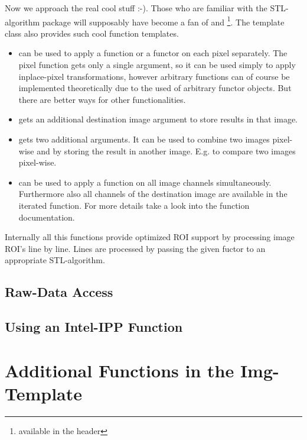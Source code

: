 Now we approach the real cool stuff :-). Those who are familiar with the STL-algorithm package will supposably have become a fan of  and \footnote{available in the  header}. The  template class also provides such cool function templates. 
\begin{itemize}
\item {} can be used to apply a function or a functor on each pixel separately. The pixel function gets only a single argument, so it can be used simply to apply inplace-pixel transformations, however arbitrary functions can of course be implemented theoretically due to the used of arbitrary functor objects. But there are better ways for other functionalities.
 
\item {} gets an additional destination image argument to store results in that image.

\item {} gets two additional arguments. It can be used to combine two images pixel-wise and by storing the result in another image. E.g. to compare two images pixel-wise.
\item {} can be used to apply a function on all image channels simultaneously. Furthermore also all channels of the destination image are available in the iterated function. For more details take a look into the function documentation.
\end{itemize}

Internally all this functions provide optimized ROI support by processing image ROI's line by line. Lines are processed by passing the given fuctor to an appropriate STL-algorithm.  



\subsection{Raw-Data Access}


\subsection{Using an Intel-IPP Function}



\section{Additional Functions in the Img-Template}






